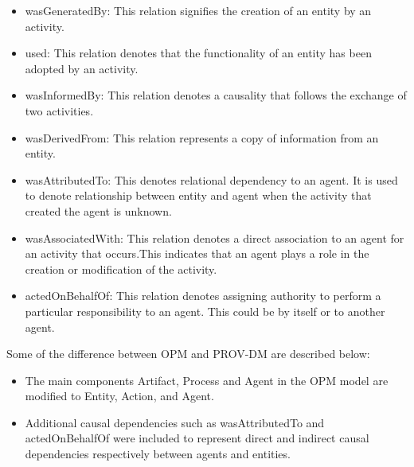 \begin{itemize}
\item wasGeneratedBy: This relation signifies the creation of an entity by an activity. 

\item used: This relation denotes that the functionality of an entity has been adopted by an activity.

\item wasInformedBy: This relation denotes a causality that follows the exchange of two activities.

\item wasDerivedFrom: This relation represents a copy of information from an entity. 

\item wasAttributedTo: This denotes relational dependency to an agent. It is used to denote relationship between entity and agent when the activity that created the agent is unknown.

\item wasAssociatedWith: This relation denotes a direct association to an agent for an activity that occurs.This indicates that an agent plays a role in the creation or modification of the activity.

\item actedOnBehalfOf: This relation denotes assigning authority to perform a particular responsibility to an agent. This could be by itself or to another agent.



\end{itemize}

Some of the difference between OPM and PROV-DM are described below:

\begin{itemize}

\item The main components Artifact, Process and Agent in the OPM model are modified to Entity, Action, and Agent. 

\item Additional causal dependencies such as wasAttributedTo and actedOnBehalfOf were included to represent direct and indirect causal dependencies respectively between agents and entities.

\end{itemize}


